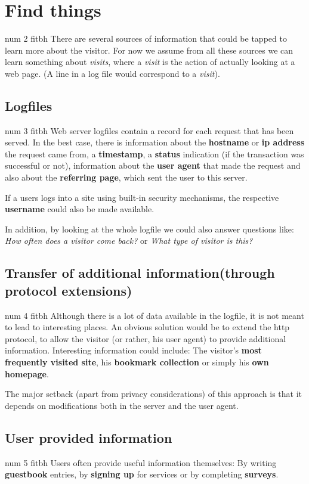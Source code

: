 \documentclass[a4paper]{danarticle}
\begin{document}
  \section*{Find things}
\pdfdest num 2 fitbh
    There are several sources of information that could be tapped to learn more
    about the visitor. For now we assume from all these sources we can learn
    something about \textit{visits}, where a \textit{visit} is the action of
    actually looking at a web page. (A line in a log file would correspond to 
    a \textit{visit}).
    \subsection*{Logfiles}
\pdfdest num 3 fitbh
      Web server logfiles contain a record for each request that has been
      served. In the best case, there is information about the \textbf{hostname}
      or \textbf{ip address} the request came from, a \textbf{timestamp}, a
      \textbf{status} indication (if the transaction was successful or not),
      information about the \textbf{user agent} that made the request and also
      about the \textbf{referring page}, which sent the user to this server.
      
      If a users logs into a site using built-in security mechanisms, the
      respective \textbf{username} could also be made available.
      
      In addition, by looking at the whole logfile we could also answer
      questions like: \textit{How often does a visitor come back?} or \textit{What
      type of visitor is this?}
    \subsection*{Transfer of additional information(through protocol extensions)}
\pdfdest num 4 fitbh
      Although there is a lot of data available in the logfile, it is not meant
      to lead to interesting places. An obvious solution would be to extend the
      http protocol, to allow the visitor (or rather, his user agent) to provide
      additional information. Interesting information could include: The
      visitor's \textbf{most frequently visited site}, his \textbf{bookmark
      collection} or simply his \textbf{own homepage}. 
      
      The major setback (apart from privacy considerations) of this approach is
      that it depends on modifications both in the server and the user agent.
    \subsection*{User provided information} 
\pdfdest num 5 fitbh
      Users often provide useful information themselves: By writing
      \textbf{guestbook} entries, by \textbf{signing up} for services or by completing
      \textbf{surveys}.
\end{document}
